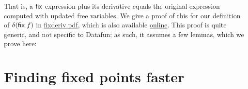 \documentclass{rntz}
\begin{document}
That is, a $\mathsf{fix}$ expression plus its derivative equals the original
expression computed with updated free variables. We give a proof of this for our
definition of $\delta(\mathsf{fix}\;f)$ in \url{fixderiv.pdf}, which is also
available \href{http://www.rntz.net/files/fixderiv.pdf}{online}. This proof is
quite generic, and not specific to Datafun; as such, it assumes a few lemmas,
which we prove here:

\par {}






\section{Finding fixed points faster}
\end{document}
